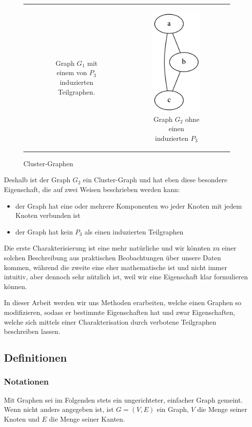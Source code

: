 \documentclass[12pt,a4paper,onecolumn,oneside,titlepage]{article}
\begin{document}
\begin{figure}
\begin{tabular}[c]{ccc}
\begin{subfigure}[b]{0.32\textwidth}
	    \caption{Graph $G_1$ mit einem von $P_3$ induzierten Teilgraphen.}
	    \label{fig:mot-1}
	  \end{subfigure}&
    \begin{subfigure}[b]{0.32\textwidth}
       \includegraphics[scale=0.5]{dot/dot_mot_2.png}
	    \caption{Graph $G_2$ ohne einen induzierten $P_3$}
	    \label{fig:mot-2}
    \end{subfigure}
  \end{tabular}
  \caption{Cluster-Graphen}\label{fig:mot}
\end{figure}

Deshalb ist der Graph $G_2$ ein Cluster-Graph und hat eben diese besondere Eigenschaft, die auf zwei Weisen beschrieben werden kann: 
\begin{itemize}
 \item der Graph hat eine oder mehrere Komponenten wo jeder Knoten mit jedem Knoten verbunden ist
 \item der Graph hat kein $P_3$ als einen induzierten Teilgraphen
\end{itemize}
Die erste Charakterisierung ist eine mehr natürliche und wir könnten zu einer solchen Beschreibung aus praktischen Beobachtungen über unsere Daten kommen, während die zweite eine eher mathematische ist und nicht immer intuitiv, aber dennoch sehr nützlich ist, weil wir eine Eigenschaft klar formulieren können.

In dieser Arbeit werden wir uns Methoden erarbeiten, welche einen Graphen so modifizieren, sodass er bestimmte Eigenschaften hat und zwar Eigenschaften, welche sich mittels einer Charakterisation durch verbotene Teilgraphen beschreiben lassen.

\subsection{Definitionen}
\subsubsection{Notationen}
\label{sec:notation}
Mit Graphen sei im Folgenden stets ein ungerichteter, einfacher Graph gemeint. Wenn nicht anders angegeben ist, ist $G=(V,E)$ ein Graph, $V$ die Menge seiner Knoten und $E$ die Menge seiner Kanten.
\end{document}

